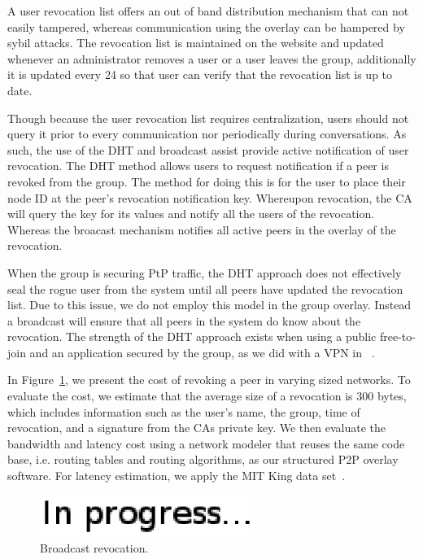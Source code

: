 \documentclass[conference]{IEEEtran}
\begin{document}
A user revocation list offers an out of band distribution mechanism that can
not easily tampered, whereas communication using the overlay can be hampered
by sybil attacks.  The revocation list is maintained on the website and updated
whenever an administrator removes a user or a user leaves the group,
additionally it is updated every 24 so that user can verify that the revocation
list is up to date.

Though because the user revocation list requires centralization, users should
not query it prior to every communication nor periodically during conversations.
As such, the use of the DHT and broadcast assist provide active notification of
user revocation.  The DHT method allows users to request notification if a peer
is revoked from the group.  The method for doing this is for the user to place
their node ID at the peer's revocation notification key.  Whereupon revocation,
the CA will query the key for its values and notify all the users of the
revocation.  Whereas the broacast mechanism notifies all active peers in the
overlay of the revocation.

When the group is securing PtP traffic, the DHT approach does not effectively
seal the rogue user from the system until all peers have updated the revocation
list.  Due to this issue, we do not employ this model in the group overlay.
Instead a broadcast will ensure that all peers in the system do know about
the revocation.  The strength of the DHT approach exists when using a public
free-to-join and an application secured by the group, as we did with a VPN in
~\cite{nsdi10}.

In Figure~\ref{fig:broadcast_revocation}, we present the cost of revoking a
peer in varying sized networks.  To evaluate the cost, we estimate that the
average size of a revocation is 300 bytes, which includes information such
as the user's name, the group, time of revocation, and a signature from the
CAs private key.  We then evaluate the bandwidth and latency cost using a
network modeler that reuses the same code base, i.e. routing tables and routing
algorithms, as our structured P2P overlay software.  For latency estimation,
we apply the MIT King data set~\cite{king_data}.

\begin{figure}[h]
\centering
\includegraphics[width=2.75in]{in_progress.eps}
\caption{Broadcast revocation.}
\label{fig:broadcast_revocation}
\end{figure}
\end{document}
